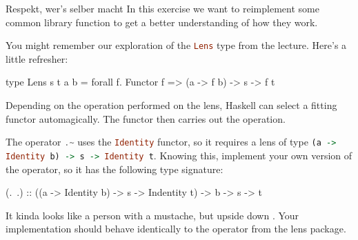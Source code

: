 \documentclass{exercise}
\newcommand\h[2][]{\lstinline[language=haskell,#1]{#2}}
\begin{document}
	\begin{exercise}{Respekt, wer's selber macht}
		In this exercise we want to reimplement some common library function to get a
		better understanding of how they work.

		You might remember our exploration of the \h{Lens} type from the lecture. Here's
		a little refresher:
		\begin{haskell}
			type Lens s t a b = forall f. Functor f => (a -> f b) -> s -> f t
		\end{haskell}
		Depending on the operation performed on the lens, Haskell can select a fitting
		functor automagically. The functor then carries out the operation.
		\begin{tasks}
		\item The operator \h{.~} uses the \h{Identity} functor, so it requires a lens
			of type \h{(a -> Identity b) -> s -> Identity t}. Knowing this, implement
			your own version of the operator, so it has the following type signature:
			\begin{haskell}
				(.~.) :: ((a -> Identity b) -> s -> Indentity t) -> b -> s -> t
			\end{haskell}
			It kinda looks like a person with a mustache, but upside down
			. Your
			implementation should behave identically to the operator from the lens
			package.


\end{tasks}
\end{exercise}
\end{document}
